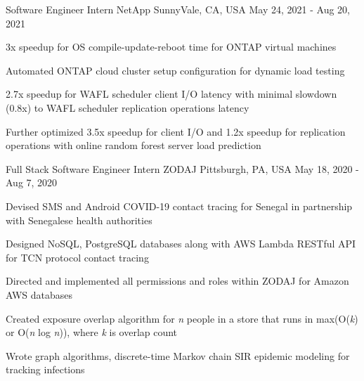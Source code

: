 \begin{cventries}
  \cventry
    {Software Engineer Intern} %
    {NetApp} %
    {SunnyVale, CA, USA} %
    {May 24, 2021 - Aug 20, 2021} %
    {
      \begin{cvitems} %
        \item {3x speedup for OS compile-update-reboot time for ONTAP virtual machines}
        \item {Automated ONTAP cloud cluster setup configuration for dynamic load testing}
        \item {2.7x speedup for WAFL scheduler client I/O latency with minimal
               slowdown (0.8x) to WAFL scheduler replication operations latency}
        \item {Further optimized 3.5x speedup for client I/O and 1.2x speedup
               for replication operations with online random forest server
               load prediction}
      \end{cvitems}
    }

  \cventry
    {Full Stack Software Engineer Intern} %
    {ZODAJ} %
    {Pittsburgh, PA, USA} %
    {May 18, 2020 - Aug 7, 2020} %
    {
      \begin{cvitems} %
        \item {Devised SMS and Android COVID-19 contact tracing for Senegal
               in partnership with Senegalese health authorities}
        \item {Designed NoSQL, PostgreSQL databases along with AWS Lambda
               RESTful API for TCN protocol contact tracing}
        \item {Directed and implemented all permissions and roles within ZODAJ
               for Amazon AWS databases}
        \item {Created exposure overlap algorithm for \textit{n} people in a
               store that runs in max(O(\textit{k}) or O(\textit{n} log
               \textit{n})), where \textit{k} is overlap count}
        \item {Wrote graph algorithms, discrete-time Markov chain SIR epidemic
               modeling for tracking infections}
      \end{cvitems}
    }


\end{cventries}
